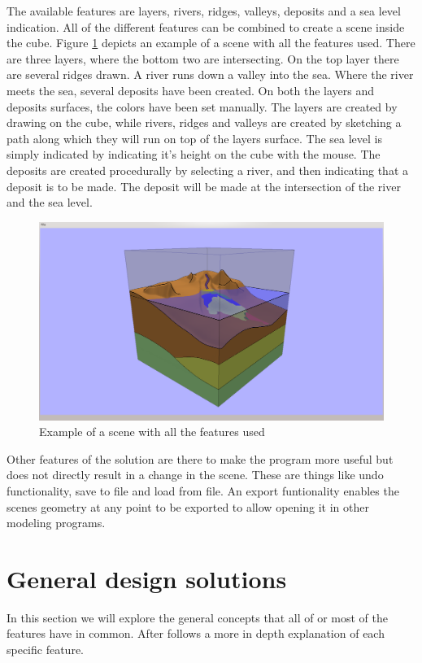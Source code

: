 \documentclass[a4paper,12pt]{report}
\begin{document}
The available features are layers, rivers, ridges, valleys, deposits and a sea level indication. All of the different features can be combined to create a scene inside the cube. Figure \ref{fig:allFeatures} depicts an example of a scene with all the features used. There are three layers, where the bottom two are intersecting. On the top layer there are several ridges drawn. A river runs down a valley into the sea. Where the river meets the sea, several deposits have been created. On both the layers and deposits surfaces, the colors have been set manually. The layers are created by drawing on the cube, while rivers, ridges and valleys are created by sketching a path along which they will run on top of the layers surface. The sea level is simply indicated by indicating it's height on the cube with the mouse. The deposits are created procedurally by selecting a river, and then indicating that a deposit is to be made. The deposit will be made at the intersection of the river and the sea level.

\begin{figure}
 \includegraphics[trim = 50mm 5mm 50mm 7mm, clip,width=\linewidth]{thesis/results/allFeatures.png}
 \caption{Example of a scene with all the features used}
 \label{fig:allFeatures}
\end{figure}


Other features of the solution are there to make the program more useful but does not directly result in a change in the scene. These are things like undo functionality, save to file and load from file. An export funtionality enables the scenes geometry at any point to be exported to allow opening it in other modeling programs.

\section{General design solutions}
\label{subsec:generaldesign}
In this section we will explore the general concepts that all of or most of the features have in common. After follows a more in depth explanation of each specific feature.
\end{document}

